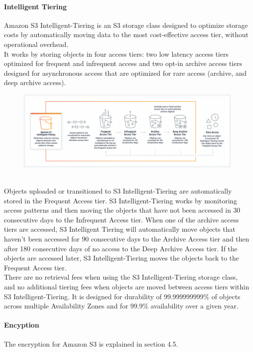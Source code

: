 \documentclass[10pt]{article}
\begin{document}
\paragraph{Intelligent Tiering}
Amazon S3 Intelligent-Tiering \cite{S3-storage-classes} is an S3 storage class designed to optimize storage costs by automatically moving data to the most cost-effective access tier, without operational overhead.\\
It works by storing objects in four access tiers: two low latency access tiers optimized for frequent and infrequent access and two opt-in archive access tiers designed for asynchronous access that are optimized for rare access (archive, and deep archive access).\\
\begin{figure}[h!]
   	\centering
   	\includegraphics[width=0.7\linewidth]{images/S3-Intelligent-Tiering.png}	
\end{figure}
\\
Objects uploaded or transitioned to S3 Intelligent-Tiering are automatically stored in the Frequent Access tier. S3 Intelligent-Tiering works by monitoring access patterns and then moving the objects that have not been accessed in 30 consecutive days to the Infrequent Access tier. When one of the archive access tiers are accessed, S3 Intelligent Tiering will automatically move objects that haven’t been accessed for 90 consecutive days to the Archive Access tier and then after 180 consecutive days of no access to the Deep Archive Access tier. If the objects are accessed later, S3 Intelligent-Tiering moves the objects back to the Frequent Access tier. \\
There are no retrieval fees when using the S3 Intelligent-Tiering storage class, and no additional tiering fees when objects are moved between access tiers within S3 Intelligent-Tiering. It is designed for durability of 99.999999999\% of objects across multiple Availability Zones and for 99.9\% availability over a given year.
\paragraph{Encyption} The encryption for Amazon S3 is explained in section 4.5. 
\end{document}
